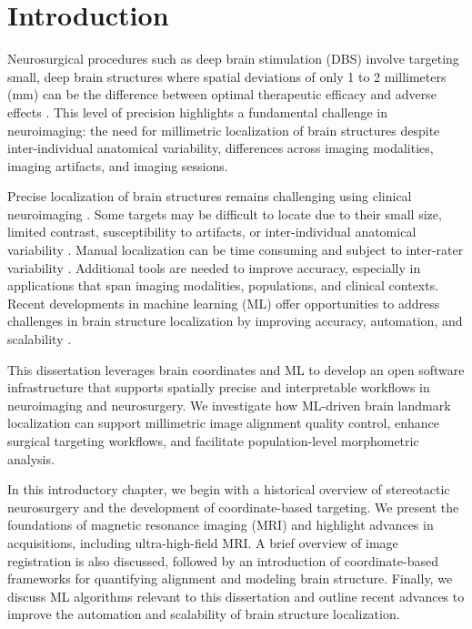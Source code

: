 \chapter{Introduction}\label{chap:intro}
\newpage
\sloppy
\noindent 
Neurosurgical procedures such as deep brain stimulation (DBS) involve targeting small, deep brain structures where spatial deviations of only 1 to 2 millimeters (mm) can be the difference between optimal therapeutic efficacy and adverse effects \cite{Horn2018-qq}. This level of precision highlights a fundamental challenge in neuroimaging: the need for millimetric localization of brain structures despite inter-individual anatomical variability, differences across imaging modalities, imaging artifacts, and imaging sessions.

Precise localization of brain structures remains challenging using clinical neuroimaging \cite{Boutet2021-vg}. Some targets may be difficult to locate due to their small size, limited contrast, susceptibility to artifacts, or inter-individual anatomical variability \cite{Lau2020-dh}. Manual localization can be time consuming and subject to inter-rater variability \cite{Miller2023-ct}. Additional tools are needed to improve accuracy, especially in applications that span imaging modalities, populations, and clinical contexts. Recent developments in machine learning (ML) offer opportunities to address challenges in brain structure localization by improving accuracy, automation, and scalability \cite{Andrews2025-kd}.

This dissertation leverages brain coordinates and ML to develop an open software infrastructure that supports spatially precise and interpretable workflows in neuroimaging and neurosurgery. We investigate how ML-driven brain landmark localization can support millimetric image alignment quality control, enhance surgical targeting workflows, and facilitate population-level morphometric analysis.

In this introductory chapter, we begin with a historical overview of stereotactic neurosurgery and the development of coordinate-based targeting. We present the foundations of magnetic resonance imaging (MRI) and highlight advances in acquisitions, including ultra-high-field MRI. A brief overview of image registration is also discussed, followed by an introduction of coordinate-based frameworks for quantifying alignment and modeling brain structure. Finally, we discuss ML algorithms relevant to this dissertation and outline recent advances to improve the automation and scalability of brain structure localization.

